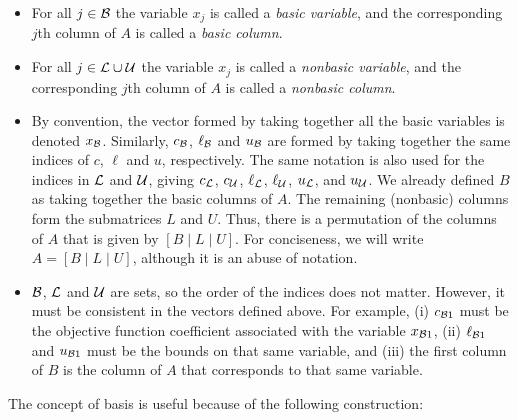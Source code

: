 \begin{itemize}
\item For all $j \in \mathcal{B}$ the variable $x_j$ is called
	a \emph{basic variable},
	and the corresponding $j$th column of $A$ is called
	a \emph{basic column}.

\item For all $j \in \mathcal{L} \cup \mathcal{U}$ the variable $x_j$ is called
	a \emph{nonbasic variable},
	and the corresponding $j$th column of $A$ is called
	a \emph{nonbasic column}.

\item By convention, the vector formed by taking together all
	the basic variables is denoted $x_{\mathcal{B}}$.
	Similarly, $c_{\mathcal{B}}$, $\ell_{\mathcal{B}}$ and $u_{\mathcal{B}}$
	are formed by taking together the same indices of
	$c$, $\ell$ and $u$, respectively.
	The same notation is also used for the indices in $\mathcal{L}$ and $\mathcal{U}$,
	giving $c_{\mathcal{L}}$, $c_{\mathcal{U}}$,
	$\ell_{\mathcal{L}}$, $\ell_{\mathcal{U}}$, $u_{\mathcal{L}}$, and $u_{\mathcal{U}}$.
	We already defined $B$ as taking together the basic columns of $A$.
	The remaining (nonbasic) columns form the
	submatrices $L$ and $U$. Thus, there is a permutation
	of the columns of $A$ that is given by
	$[ B \; | \; L \; | \; U ]$.
	For conciseness, we will write
	$A = [ B \; | \; L \; | \; U ]$, although it is an abuse
	of notation.

\item $\mathcal{B}$, $\mathcal{L}$ and $\mathcal{U}$ are sets, so the order of the indices does
	not matter. However, it must be consistent in the vectors
	defined above. For example,
	(i) $c_{\mathcal{B}1}$ must be the objective function
	coefficient associated with the variable $x_{\mathcal{B}1}$,
	(ii) $\ell_{\mathcal{B}1}$ and $u_{\mathcal{B}1}$ must be the bounds on that same
	variable, and (iii) the first column of $B$ is the column of $A$
	that corresponds to that same variable.
\end{itemize}
The concept of basis is useful because of the following construction:
